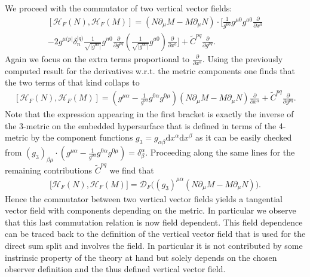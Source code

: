 \documentclass[a4paper,12pt, DIV=14, BCOR=5mm, twoside, headsepline]{scrbook}
\begin{document}
We proceed with the commutator of two vertical vector fields:
\begin{multline}
    \left[ \mathcal{H}_F(N), \mathcal{H}_F(M) \right] = \left( N\partial_{\mu} M - M \partial_{\mu}N  \right) \cdot \biggl[ \frac{1}{g^{00}} g^{\mu 0} g^{a0} \frac{\partial}{\partial x^a}  \\
    -2 g^{\mu (p\vert} \delta^{\vert q)}_{n} \frac{1}{\sqrt{\vert g^{00} \vert }} g^{n0}  \frac{\partial}{\partial g ^{pq}} \left( \frac{1}{\sqrt{\vert g^{00} \vert }} g^{a0} \right) \frac{\partial}{\partial x^a} \biggr] + \tilde{C}^{pq} \frac{\partial}{\partial g^{pq}}.
\end{multline}
Again we focus on the extra terms proportional to $\frac{\partial}{\partial x^a}$. Using the previously computed result for the derivatives w.r.t. the metric components one finds that the two terms of that kind collaps to 
\begin{align}
    \left[ \mathcal{H}_F(N), \mathcal{H}_F(M) \right] = \left( g^{\mu \alpha} - \frac{1}{g^{00}} g^{0\alpha} g^{0 \mu} \right) \left( N\partial_{\mu} M - M \partial_{\mu}N  \right) \frac{\partial}{\partial x^{\alpha}} + \tilde{C}^{pq} \frac{\partial}{\partial g^{pq}}.
\end{align}
Note that the expression appearing in the first bracket is exactly the inverse of the 3-metric on the embedded hypersurface that is defined in terms of the 4-metric by the component functions $g_3 = g_{\alpha \beta} \mathrm{d}x^{\alpha} \mathrm{d}x^{\beta}$ as it can be easily checked from $(g_3)_{\beta \mu } \cdot ( g^{\mu \alpha} - \frac{1}{g^{00}} g^{0\alpha} g^{0 \mu} ) = \delta_{\beta}^{\alpha}$. Proceeding along the same lines for the remaining contributions $\tilde{C}^{pq}$ we find that
\begin{align}\label{FHH}
    \bigl[ \mathcal{H}_F(N), \mathcal{H}_F(M) \bigr] =  \mathcal{D}_F\bigl( (g_3)^{\mu \alpha}( N\partial_{\mu} M - M \partial_{\mu}N  ) \bigr).
\end{align}
Hence the commutator between two vertical vector fields yields a tangential vector field with components depending on the metric.
In particular we observe that this last commutation relation is now field dependent. This field dependence can be traced back to the definition of the vertical vector field that is used for the direct sum split and involves the field. 
In particular it is not contributed by some instrinsic property of the theory at hand but solely depends on the chosen observer definition and the thus defined vertical vector field.\\
\end{document}
